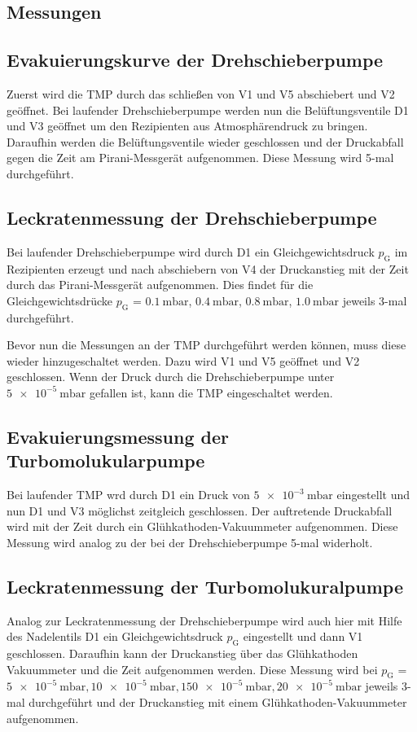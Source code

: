 \subsection{Messungen}
\subsection{Evakuierungskurve der Drehschieberpumpe}
Zuerst wird die TMP durch das schließen von V1 und V5 abschiebert und V2 geöffnet.
Bei laufender Drehschieberpumpe werden nun die Belüftungsventile D1 und V3 geöffnet
um den Rezipienten aus Atmosphärendruck zu bringen. Daraufhin werden die Belüftungsventile
wieder geschlossen und der Druckabfall gegen die Zeit am Pirani-Messgerät aufgenommen.
Diese Messung wird 5-mal durchgeführt.
\subsection{Leckratenmessung der Drehschieberpumpe}
Bei laufender Drehschieberpumpe wird durch D1 ein Gleichgewichtsdruck $p_\text{G}$
im Rezipienten erzeugt und nach abschiebern von V4 der Druckanstieg mit der Zeit durch
das Pirani-Messgerät aufgenommen. Dies findet für die Gleichgewichtsdrücke
$p_\text{G}$ = {$\SI{0.1}{\milli\bar}$, $\SI{0.4}{\milli\bar}$, $\SI{0.8}{\milli\bar}$,
$\SI{1.0}{\milli\bar}$} jeweils 3-mal durchgeführt.

Bevor nun die Messungen an der TMP durchgeführt werden können, muss diese wieder
hinzugeschaltet werden. Dazu wird V1 und V5 geöffnet und V2 geschlossen. Wenn der
Druck durch die Drehschieberpumpe unter $\SI{5e-5}{\milli\bar}$ gefallen ist, kann
die TMP eingeschaltet werden.
\subsection{Evakuierungsmessung der Turbomolukularpumpe}
Bei laufender TMP wrd durch D1 ein Druck von $\SI{5e-3}{\milli\bar}$ eingestellt
und nun D1 und V3 möglichst zeitgleich geschlossen. Der auftretende Druckabfall
wird mit der Zeit durch ein Glühkathoden-Vakuummeter aufgenommen. Diese Messung
wird analog zu der bei der Drehschieberpumpe 5-mal widerholt.
\subsection{Leckratenmessung der Turbomolukuralpumpe}
Analog zur Leckratenmessung  der Drehschieberpumpe wird auch hier mit Hilfe des Nadelentils
D1 ein Gleichgewichtsdruck $p_\text{G}$ eingestellt und dann V1 geschlossen. Daraufhin
kann der Druckanstieg über das Glühkathoden Vakuummeter und die Zeit aufgenommen werden.
Diese Messung wird bei $p_\text{G}$ = ${\SI{5e-5}{\milli\bar}, \SI{10e-5}{\milli\bar},
\SI{150e-5}{\milli\bar}, \SI{20e-5}{\milli\bar}}$ jeweils 3-mal durchgeführt und der Druckanstieg mit einem
Glühkathoden-Vakuummeter aufgenommen.

